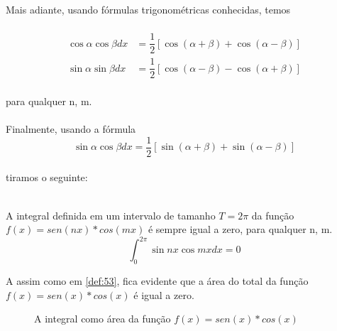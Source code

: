  
Mais adiante, usando fórmulas trigonométricas conhecidas, temos\\
\\
\begin{equation}
\label{eq:54}
    \begin{split}
        \cos{\alpha}\cos{\beta} dx & = \dfrac{1}{2}[\cos{(\alpha + \beta)} + \cos{(\alpha - \beta)}]\\
        \sin{\alpha}\sin{\beta}dx & = \dfrac{1}{2}[\cos{(\alpha - \beta)} - \cos{(\alpha + \beta)}]
    \end{split}
\end{equation}
\\
para qualquer n, m.\\
\\
Finalmente, usando a fórmula \\
\begin{equation}
        \sin{\alpha}\cos{\beta} dx = \dfrac{1}{2}[\sin{(\alpha + \beta)} + \sin{(\alpha - \beta)}]    
\end{equation}
\\
tiramos o seguinte:\\
\\
\begin{definicao}
    \label{def:55}
    A integral definida em um intervalo de tamanho $T=2\pi$ da função $f(x)=sen(nx)*cos(mx)$
    é sempre igual a zero, para qualquer n, m.
    \begin{equation}
        \int_{0}^{2\pi}\sin{nx}\cos{mx}dx = 0
    \end{equation}
\end{definicao}

A assim como em \ref{def:53}, fica evidente que a área do total da função 
$f(x)=sen(x)*cos(x)$ é igual a zero.
\begin{figure}[H]
\caption{A integral como área da função $f(x)=sen(x)*cos(x)$}
\label{fig:intSenCos}
\end{figure}

